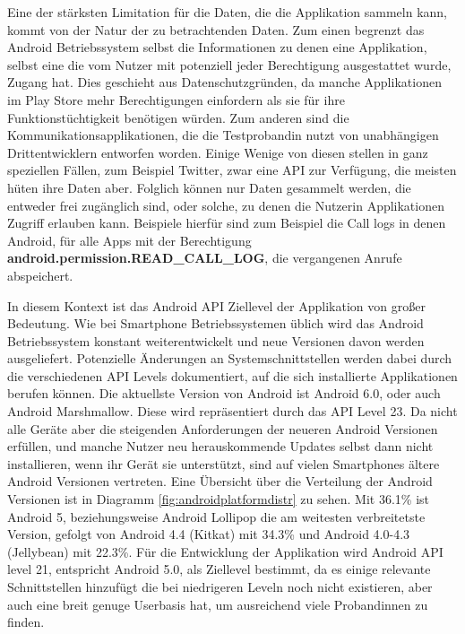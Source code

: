Eine der stärksten Limitation für die Daten, die die Applikation sammeln kann, kommt von der Natur der zu betrachtenden Daten.
Zum einen begrenzt das Android Betriebssystem selbst die Informationen zu denen eine Applikation, selbst eine die vom Nutzer mit potenziell jeder Berechtigung ausgestattet wurde, Zugang hat.
Dies geschieht aus Datenschutzgründen, da manche Applikationen im Play Store mehr Berechtigungen einfordern als sie für ihre Funktionstüchtigkeit benötigen würden.
Zum anderen sind die Kommunikationsapplikationen, die die Testprobandin nutzt von unabhängigen Drittentwicklern entworfen worden.
Einige Wenige von diesen stellen in ganz speziellen Fällen, zum Beispiel Twitter\cite{twitterapi}, zwar eine API zur Verfügung, die meisten hüten ihre Daten aber.
Folglich können nur Daten gesammelt werden, die entweder frei zugänglich sind, oder solche, zu denen die Nutzerin Applikationen Zugriff erlauben kann.
Beispiele hierfür sind zum Beispiel die Call logs in denen Android, für alle Apps mit der Berechtigung \textbf{android.permission.READ\_CALL\_LOG}, die vergangenen Anrufe abspeichert.
\par

In diesem Kontext ist das Android API Ziellevel der Applikation von großer Bedeutung.
Wie bei Smartphone Betriebssystemen üblich wird das Android Betriebssystem konstant weiterentwickelt und neue Versionen davon werden ausgeliefert.
Potenzielle Änderungen an Systemschnittstellen werden dabei durch die verschiedenen API Levels dokumentiert, auf die sich installierte Applikationen berufen können.
Die aktuellste Version von Android ist Android 6.0, oder auch Android Marshmallow.
Diese wird repräsentiert durch das API Level 23.
Da nicht alle Geräte aber die steigenden Anforderungen der neueren Android Versionen erfüllen, 
und manche Nutzer neu herauskommende Updates selbst dann nicht installieren, wenn ihr Gerät sie unterstützt, 
sind auf vielen Smartphones ältere Android Versionen vertreten.
Eine Übersicht über die Verteilung der Android Versionen ist in Diagramm \ref{fig:androidplatformdistr} zu sehen.
Mit 36.1\% ist Android 5, beziehungsweise Android Lollipop die am weitesten verbreitetste Version,
gefolgt von Android 4.4 (Kitkat) mit 34.3\% und Android 4.0-4.3 (Jellybean) mit 22.3\%\cite{androiddistr}.
Für die Entwicklung der Applikation wird Android API level 21, entspricht Android 5.0, als Ziellevel bestimmt, da es einige relevante Schnittstellen hinzufügt die bei niedrigeren Leveln noch nicht existieren, aber auch eine breit genuge Userbasis hat, um ausreichend viele Probandinnen zu finden.



